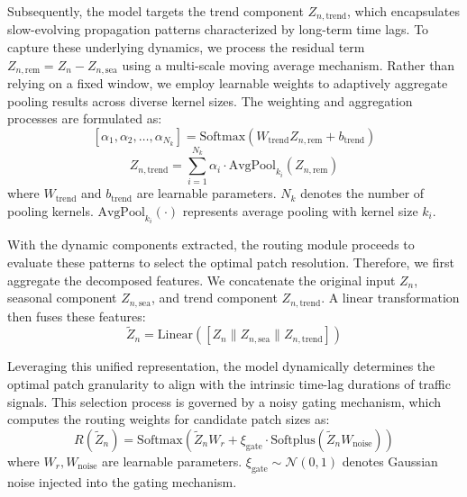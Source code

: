 \documentclass[5p,times,authoryear]{elsarticle}
\begin{document}
Subsequently, the model targets the trend component $Z_{n, \text{trend}}$, which encapsulates slow-evolving propagation patterns characterized by long-term time lags. To capture these underlying dynamics, we process the residual term $Z_{n, \text{rem}} = Z_n - Z_{n, \text{sea}}$ using a multi-scale moving average mechanism. Rather than relying on a fixed window, we employ learnable weights to adaptively aggregate pooling results across diverse kernel sizes. The weighting and aggregation processes are formulated as:
\vspace{-3pt}
\begin{equation}
\label{eq:trend_weights}
[\alpha_1, \alpha_2, \ldots, \alpha_{N_k}] = \text{Softmax}(W_{\text{trend}} Z_{n, \text{rem}} + b_{\text{trend}})
\end{equation}
\vspace{-3pt}
\vspace{-10pt}
\begin{equation}
\label{eq:trend_component}
Z_{n, \text{trend}} = \sum_{i=1}^{N_k} \alpha_i \cdot \text{AvgPool}_{k_i}(Z_{n, \text{rem}})
\end{equation}
\vspace{-3pt}
where $W_{\text{trend}}$ and $b_{\text{trend}}$ are learnable parameters. $N_k$ denotes the number of pooling kernels. $\text{AvgPool}_{k_i}(\cdot)$ represents average pooling with kernel size $k_i$.

With the dynamic components extracted, the routing module proceeds to evaluate these patterns to select the optimal patch resolution. Therefore, we first aggregate the decomposed features. We concatenate the original input $Z_n$, seasonal component $Z_{n, \text{sea}}$, and trend component $Z_{n, \text{trend}}$. A linear transformation then fuses these features:
\vspace{-3pt}
\begin{equation}
\label{eq:feature_aggregation}
    \tilde{Z}_{n} = \text{Linear}([Z_n \parallel Z_{n, \text{sea}} \parallel Z_{n, \text{trend}}])
\end{equation}
\vspace{-3pt}

Leveraging this unified representation, the model dynamically determines the optimal patch granularity to align with the intrinsic time-lag durations of traffic signals. This selection process is governed by a noisy gating mechanism, which computes the routing weights for candidate patch sizes as:
\vspace{-3pt}
\begin{equation}
\label{eq:routing_weights}
    R(\tilde{Z}_{n}) =  \text{Softmax}(\tilde{Z}_{n}W_r + \xi_{\text{gate}} \cdot \text{Softplus}(\tilde{Z}_{n}W_{\text{noise}}))
\end{equation}
\vspace{-3pt}
where $W_r, W_{\text{noise}}$ are learnable parameters. $\xi_{\text{gate}} \sim \mathcal{N}(0, 1)$ denotes Gaussian noise injected into the gating mechanism.
\end{document}
